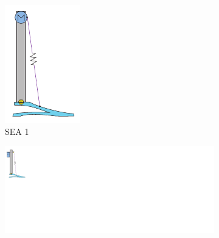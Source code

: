 \begin{figure}[hb!]
\label{fig:compliance}
  \begin{subfigure}{.19\textwidth}
    \centering
    \includegraphics[width=\linewidth]{figures/illustration_serial_direct_i.pdf}
    \caption{SEA 1}
    \label{fig:series1}
  \end{subfigure}
  \begin{subfigure}{.19\textwidth}
    \centering
    \includegraphics[width=\linewidth]{figures/illustration_serial_pulley.pdf}

\end{subfigure}
\end{figure}
